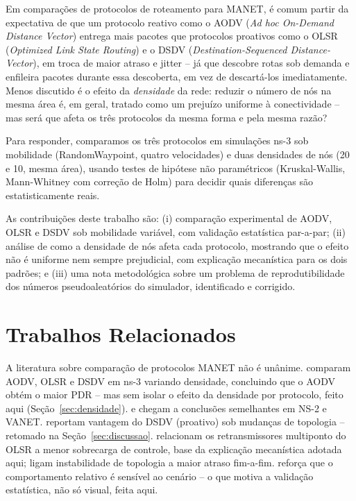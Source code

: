 \documentclass[12pt]{article}
\begin{document}
Em comparações de protocolos de roteamento para MANET, é comum partir da expectativa de que um protocolo reativo como o AODV (\textit{Ad hoc On-Demand Distance Vector}) entrega mais pacotes que protocolos proativos como o OLSR (\textit{Optimized Link State Routing}) e o DSDV (\textit{Destination-Sequenced Distance-Vector}), em troca de maior atraso e jitter -- já que descobre rotas sob demanda e enfileira pacotes durante essa descoberta, em vez de descartá-los imediatamente. Menos discutido é o efeito da \emph{densidade} da rede: reduzir o número de nós na mesma área é, em geral, tratado como um prejuízo uniforme à conectividade -- mas será que afeta os três protocolos da mesma forma e pela mesma razão?

Para responder, comparamos os três protocolos em simulações ns-3 sob mobilidade (RandomWaypoint, quatro velocidades) e duas densidades de nós (20 e 10, mesma área), usando testes de hipótese não paramétricos (Kruskal-Wallis, Mann-Whitney com correção de Holm) para decidir quais diferenças são estatisticamente reais.

As contribuições deste trabalho são: (i) comparação experimental de AODV, OLSR e DSDV sob mobilidade variável, com validação estatística par-a-par; (ii) análise de como a densidade de nós afeta cada protocolo, mostrando que o efeito não é uniforme nem sempre prejudicial, com explicação mecanística para os dois padrões; e (iii) uma nota metodológica sobre um problema de reprodutibilidade dos números pseudoaleatórios do simulador, identificado e corrigido.

\section{Trabalhos Relacionados}

A literatura sobre comparação de protocolos MANET não é unânime. \cite{quadri2025} comparam AODV, OLSR e DSDV em ns-3 variando densidade, concluindo que o AODV obtém o maior PDR -- mas sem isolar o efeito da densidade por protocolo, feito aqui (Seção~\ref{sec:densidade}). \cite{arunkumar2008} e \cite{shrivastava2021} chegam a conclusões semelhantes em NS-2 e VANET. \cite{alkhatib2018} reportam vantagem do DSDV (proativo) sob mudanças de topologia -- retomado na Seção~\ref{sec:discussao}. \cite{alzahrani2020} relacionam os retransmissores multiponto do OLSR a menor sobrecarga de controle, base da explicação mecanística adotada aqui; \cite{almaliki2024} ligam instabilidade de topologia a maior atraso fim-a-fim. \cite{chrysoula2012} reforça que o comportamento relativo é sensível ao cenário -- o que motiva a validação estatística, não só visual, feita aqui.
\end{document}
